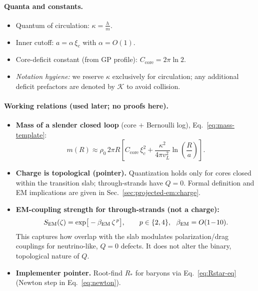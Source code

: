 \paragraph{Quanta and constants.}
\begin{itemize}
  \item Quantum of circulation: $\kappa=\frac{h}{m}$.
  \item Inner cutoff: $a=\alpha\,\xi_c$ with $\alpha=O(1)$.
  \item Core-deficit constant (from GP profile): $C_{\mathrm{core}}=2\pi\ln 2$.
  \item \emph{Notation hygiene:} we reserve $\kappa$ exclusively for circulation; any additional deficit prefactors are denoted by $\mathcal{K}$ to avoid collision.
\end{itemize}

\paragraph{Working relations (used later; no proofs here).}
\begin{itemize}
  \item \textbf{Mass of a slender closed loop} (core $+$ Bernoulli log), Eq.~\eqref{eq:mass-template}:
  \[
  m(R)\approx \rho_0\,2\pi R\left[
  C_{\mathrm{core}}\,\xi_c^2+\frac{\kappa^2}{4\pi v_L^2}\ln\!\left(\frac{R}{a}\right)\right].
  \]
  \item \textbf{Charge is topological (pointer).} Quantization holds only for cores closed within the transition slab; through-strands have $Q=0$. Formal definition and EM implications are given in Sec.~\ref{sec:projected-em:charge}.
  \item \textbf{EM-coupling strength for through-strands (not a charge):}
  \[
  S_{\rm EM}(\zeta)=\exp\!\big[-\beta_{\rm EM}\,\zeta^{\,p}\big],\qquad
  p\in\{2,4\},\ \ \beta_{\rm EM}=O(1\!-\!10).
  \]
  This captures how overlap with the slab modulates polarization/drag couplings for neutrino-like, $Q=0$ defects. It does not alter the binary, topological nature of $Q$.
  \item \textbf{Implementer pointer.} Root-find $R_\ast$ for baryons via Eq.~\eqref{eq:Rstar-eq} (Newton step in Eq.~\eqref{eq:newton}).
\end{itemize}

